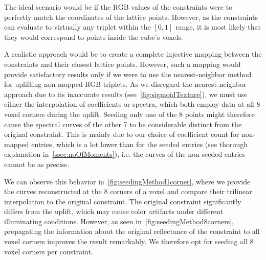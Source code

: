 The ideal scenario would be if the RGB values of the constraints were to perfectly match the coordinates of the lattice points. However, as the constraints can evaluate to virtually any triplet within the $[0,1]$ range, it is most likely that they would correspond to points inside the cube's voxels.

A realistic approach would be to create a complete injective mapping between the constraints and their closest lattice points. However, such a mapping would provide satisfactory results only if we were to use the nearest-neighbor method for uplifting non-mapped RGB triplets. As we disregard the nearest-neighbor approach due to its inaccurate results (see~\cref{fig:sigmoidTexture}), we must use either the interpolation of coefficients or spectra, which both employ data at all 8 voxel corners during the uplift. Seeding only one of the 8 points might therefore cause the spectral curves of the other 7 to be considerable distinct from the original constraint. This is mainly due to our choice of coefficient count for non-mapped entries, which is a lot lower than for the seeded entries (see thorough explanation in~\cref{ssec:noOfMoments}), i.e. the curves of the non-seeded entries cannot be as precise. 

We can observe this behavior in~\cref{fig:seedingMethod1corner}, where we provide the curves reconstructed at the 8 corners of a voxel and compare their trilinear interpolation to the original constraint. The original constraint significantly differs from the uplift, which may cause color artifacts under different illuminating conditions. However, as seen in~\cref{fig:seedingMethod8corners}, propagating the information about the original reflectance of the constraint to all voxel corners improves the result remarkably. We therefore opt for seeding all 8 voxel corners per constraint.

